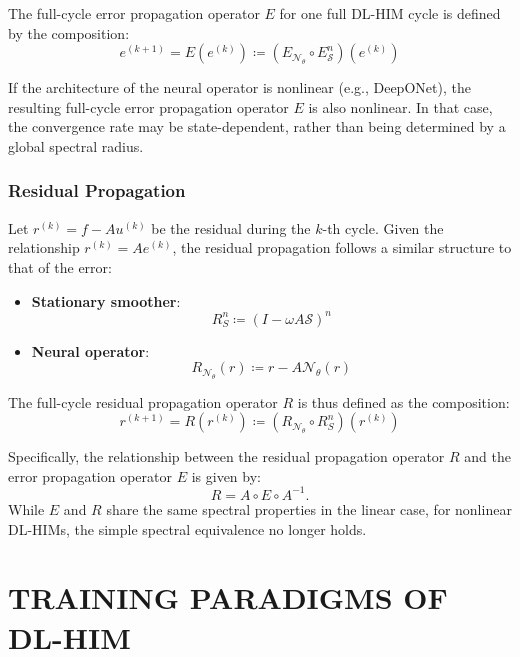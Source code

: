 \documentclass[11pt]{article}
\begin{document}
The full-cycle error propagation operator $E$ for one full DL-HIM cycle is defined by the composition:
\begin{equation}
    e^{(k+1)} = E(e^{(k)}) \coloneqq (E_{\mathcal{N}_\theta} \circ E_{\mathcal{S}}^n)(e^{(k)})
\end{equation}

If the architecture of the neural operator is nonlinear (e.g., DeepONet), the resulting full-cycle error propagation operator $E$ is also nonlinear. In that case, the convergence rate may be state-dependent, rather than being determined by a global spectral radius.

\subsubsection{Residual Propagation}
Let $r^{(k)} = f - A u^{(k)}$ be the residual during the $k$-th cycle. Given the relationship $r^{(k)} = Ae^{(k)}$, the residual propagation follows a similar structure to that of the error:
\begin{itemize}
    \item \textbf{Stationary smoother}:
          \begin{equation}
              R_S^n \coloneqq (I - \omega A \mathcal S)^n
          \end{equation}

    \item \textbf{Neural operator}:
          \begin{equation}
              R_{\mathcal{N}_\theta}(r) \coloneqq r - A \mathcal{N}_\theta(r)
          \end{equation}
\end{itemize}

The full-cycle residual propagation operator $R$ is thus defined as the composition:
\begin{equation}
    r^{(k+1)} = R(r^{(k)}) \coloneqq (R_{\mathcal{N}_\theta} \circ R_S^n)(r^{(k)})
\end{equation}

Specifically, the relationship between the residual propagation operator $R$ and the error propagation operator $E$ is given by:
$$
    R = A\circ E\circ A^{-1}.
$$
While $E$ and $R$ share the same spectral properties in the linear case, for nonlinear DL-HIMs, the simple spectral equivalence no longer holds.

\section{TRAINING PARADIGMS OF DL-HIM}
\end{document}
